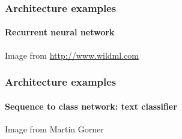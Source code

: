 \documentclass[9pt]{beamer}
\begin{document}
\begin{frame}
  \frametitle{Architecture examples}

  \framesubtitle{Recurrent neural network}

  \begin{center}
  \end{center}

  {\small Image from \url{http://www.wildml.com}}
\end{frame}

\begin{frame}
  \frametitle{Architecture examples}

  \framesubtitle{Sequence to class network: text classifier}

  \begin{center}
  \end{center}

  {\small Image from Martin Gorner}
\end{frame}
\end{document}
